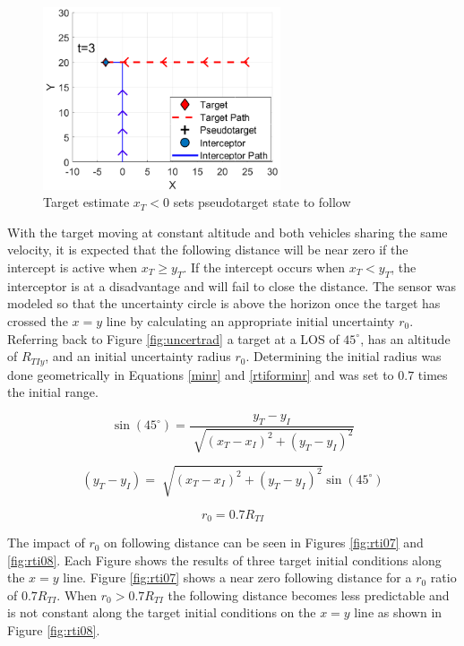 \documentclass[conference]{IEEEtran}
\begin{document}
\begin{figure}[H]
	\centering
	\includegraphics[width=7cm]{follow}
	\caption{Target estimate $x_T < 0$ sets pseudotarget state to follow}
	\label{fig:follow}
\end{figure}



With the target moving at constant altitude and both vehicles sharing the same velocity, it is expected that the following distance will be near zero if the intercept is active when $x_T \geq y_T$. If the intercept occurs when $x_T<y_T$, the interceptor is at a disadvantage and will fail to close the distance. The sensor was modeled so that the uncertainty circle is above the horizon once the target has crossed the $x=y$ line by calculating an appropriate initial uncertainty $r_0$. Referring back to Figure \ref{fig:uncertrad} a target at a LOS of $45^{\circ}$, has an altitude of $R_{TIy}$, and an initial uncertainty radius $r_0$. Determining the initial radius was done geometrically in Equations \ref{minr} and \ref{rtiforminr} and was set to $0.7$ times the initial range.



\begin{equation} \label{minr}
\sin(45^\circ) = \frac{y_T - y_I}{\sqrt[]{(x_T - x_I)^2+(y_T - y_I)^2}}
\end{equation}



\begin{equation} \label{rtiforminr}
 (y_T - y_I) = \sqrt[]{(x_T - x_I)^2+(y_T - y_I)^2}\sin(45^\circ)
\end{equation}



\begin{equation} \label{initialr}
r_0 = 0.7R_{TI}
\end{equation}

The impact of $r_0$ on following distance can be seen in Figures \ref{fig:rti07} and \ref{fig:rti08}.
 Each Figure shows the results of three target initial conditions along the $x=y$ line. Figure \ref{fig:rti07} shows a near zero following distance for a $r_0$ ratio of $0.7R_{TI}$. When $r_0>0.7R_{TI}$ the following distance becomes less predictable and is not constant along the target initial conditions on the $x=y$ line as shown in Figure \ref{fig:rti08}.
 
\end{document}
